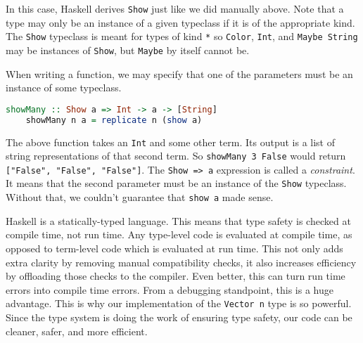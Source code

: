 \documentclass[MS, xcolor=dvipsnames]{wfuthesis}
\theoremstyle{definition}
\begin{document}
In this case, Haskell derives \lstinline{Show} just like we did manually above. Note that a type may only be an instance of a given typeclass if it is of the appropriate kind. The \lstinline{Show} typeclass is meant for types of kind \lstinline{*} so \lstinline{Color}, \lstinline{Int}, and \lstinline{Maybe String} may be instances of \lstinline{Show}, but \lstinline{Maybe} by itself cannot be. \par 
When writing a function,  we may specify that one of the parameters must be an instance of some typeclass. 
\begin{lstlisting}[language=Haskell]
showMany :: Show a => Int -> a -> [String]
    showMany n a = replicate n (show a)
\end{lstlisting}
The above function takes an \lstinline{Int} and some other term. Its output is a list of string representations of that second term. So \lstinline{showMany 3 False} would return \lstinline{["False", "False", "False"]}. The \lstinline{Show => a} expression is called a \emph{constraint}. It means that the second parameter must be an instance of the \lstinline{Show} typeclass. Without that, we couldn't guarantee that \lstinline{show a} made sense. \par 
Haskell is a statically-typed language. This means that type safety is checked at compile time, not run time. Any type-level code is evaluated at compile time, as opposed to term-level code which is evaluated at run time. This not only adds extra clarity by removing manual compatibility checks, it also increases efficiency by offloading those checks to the compiler. Even better, this can turn run time errors into compile time errors. From a debugging standpoint, this is a huge advantage. This is why our implementation of the \lstinline{Vector n} type is so powerful. Since the type system is doing the work of ensuring type safety, our code can be cleaner, safer, and more efficient. 
\end{document}
